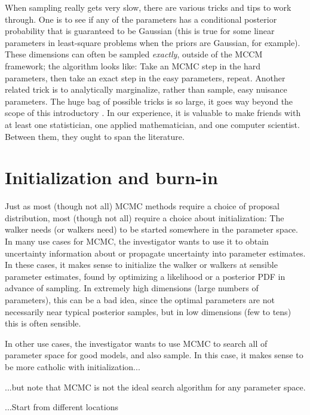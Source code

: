 \documentclass[12pt,twoside,pdftex]{article}
\begin{document}
When sampling really gets very slow,
  there are various tricks and tips to work through.
One is to see if any of the parameters has a conditional posterior
  probability that is guaranteed to be Gaussian
  (this is true for some linear parameters in least-square problems
  when the priors are Gaussian, for example).
These dimensions can often be sampled \emph{exactly},
  outside of the MCCM framework;
  the algorithm looks like:
Take an MCMC step in the hard parameters,
  then take an exact step in the easy parameters,
  repeat.
Another related trick is to analytically marginalize,
  rather than sample,
  easy nuisance parameters.
The huge bag of possible tricks is so large,
  it goes way beyond the scope of this introductory \documentname.
In our experience, it is valuable to make friends with at least one statistician,
  one applied mathematician, and one computer scientist.
Between them, they ought to span the literature.

\section{Initialization and burn-in}

Just as most (though not all) MCMC methods require a choice of proposal distribution,
  most (though not all) require a choice about initialization:
The walker needs (or walkers need) to be started somewhere in the parameter space.
In many use cases for MCMC,
  the investigator wants to use it to obtain uncertainty information about
  or propagate uncertainty into parameter estimates.
In these cases, it makes sense to initialize the walker or walkers at sensible parameter estimates,
  found by optimizing a likelihood or a posterior PDF in advance of sampling.
In extremely high dimensions (large numbers of parameters), this can be a bad idea,
  since the optimal parameters are not necessarily near typical posterior samples,
  but in low dimensions (few to tens) this is often sensible.

In other use cases,
  the investigator wants to use MCMC to search all of parameter space
  for good models, and also sample.
In this case, it makes sense to be more catholic with initialization...

...but note that MCMC is not the ideal search algorithm for any parameter space.

...Start from different locations
\end{document}
